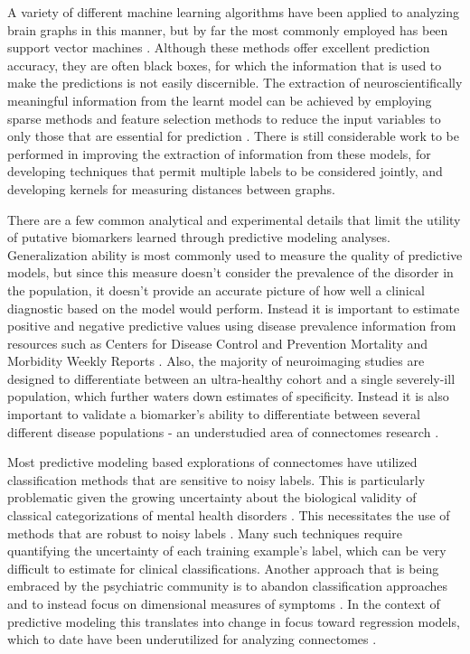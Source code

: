 \documentclass{bmcart}
\begin{document}
A variety of different machine learning algorithms have been applied to analyzing brain graphs in this manner, but by far the most commonly employed has been support vector machines \cite{Castellanos2013}. Although these methods  offer excellent prediction accuracy, they are often black boxes, for which the information that is used to make the predictions is not easily discernible. The extraction of neuroscientifically meaningful information from the learnt model can be achieved by employing sparse methods \cite{Ryali2010} and feature selection methods \cite{Craddock2009} to reduce the input variables to only those that are essential for prediction \cite{Varoquaux2013}.  There is still considerable work to be performed in improving the extraction of information from these models, for developing techniques that permit multiple labels to be considered jointly, and developing kernels for measuring distances between graphs.

There are a few common analytical and experimental details that limit the utility of putative biomarkers learned through predictive modeling analyses.  Generalization ability is most commonly used to measure the quality of predictive models, but since this measure doesn't consider the prevalence of the disorder in the population, it doesn't provide an accurate picture of how well a clinical diagnostic based on the model would perform. Instead it is important to estimate positive and negative predictive values \cite{Grimes2002,Altman1994} using disease prevalence information from resources such as Centers for Disease Control and Prevention Mortality and Morbidity Weekly Reports \cite{CDCMMWR}. Also, the majority of neuroimaging studies are designed to differentiate between an ultra-healthy cohort and a single severely-ill population, which further waters down estimates of specificity. Instead it is also important to validate a biomarker's ability to differentiate between several different disease populations - an understudied area of connectomes research \cite{Kapur2012}. 

Most predictive modeling based explorations of connectomes have utilized classification methods that are sensitive to noisy labels. This is particularly problematic given the growing uncertainty about the biological validity of classical categorizations of mental health disorders \cite{Kapur2012}. This necessitates the use of methods that are robust to noisy labels \cite{Lugosi1992,Scott2013}. Many such techniques require quantifying the uncertainty of each training example's label, which can be very difficult to estimate for clinical classifications. Another approach that is being embraced by the psychiatric community is to abandon classification approaches and to instead focus on dimensional measures of symptoms \cite{Insel2010}. In the context of predictive modeling this translates into change in focus toward regression models, which to date have been underutilized for analyzing connectomes \cite{Castellanos2013}. 
\end{document}
